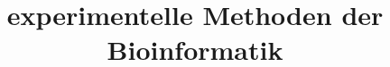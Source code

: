 \documentclass[12pt,a4paper]{article}
\title{\Huge\textbf{experimentelle Methoden der Bioinformatik}}
\author{}
\date{}
\begin{document}
\begin{titlepage}

\maketitle
\thispagestyle{empty}
\end{titlepage}
\newpage

\begin{titlepage}
\tableofcontents
\thispagestyle{empty}
\end{titlepage}
\newpage



\newpage



\newpage



\newpage



\newpage



\newpage



\newpage


\end{document}
